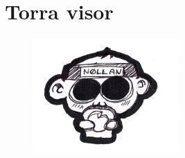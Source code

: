
\chapter{Torra visor}

\begin{figure}[H]
    \centering
    \includegraphics[width=0.5\textwidth]{nollan_macka.png}
\end{figure}

\newpage







\newpage